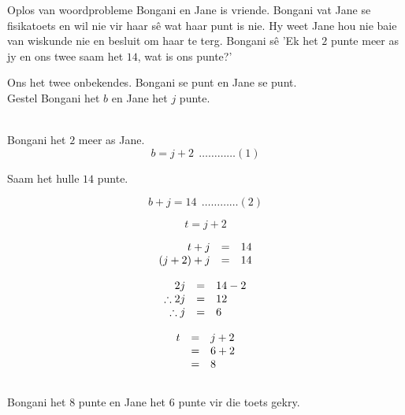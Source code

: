 \begin{wex}{Oplos van woordprobleme}{
Bongani en Jane is vriende. Bongani vat Jane se fisikatoets en wil nie vir haar s\^e wat haar punt is nie. Hy weet Jane hou nie baie van wiskunde nie en besluit om haar te terg. Bongani s\^e 
'Ek het $2$ punte meer as jy en ons twee saam het $14$, wat is ons punte?'}
{
Ons het twee onbekendes. Bongani se punt en Jane se punt.
\\Gestel Bongani het $b$ en Jane het $j$ punte. 

\\Bongani het $2$ meer as Jane.
\begin{equation*}
  b=j+2 ~~\ldots \ldots \ldots \ldots (1)
\end{equation*}

Saam het hulle $14$ punte.

\begin{equation*}
  b+j=14 ~~\ldots \ldots \ldots \ldots (2)
\end{equation*}

\begin{equation*}
t=j+2
\end{equation*}

\begin{equation*}
    \begin{array}{ccc}\hfill t+j& =& 14\hfill \\
	\hfill (j+2)+j& =& 14\hfill \\

    \end{array}
\end{equation*}

\begin{equation*}
    \begin{array}{ccl}\hfill 2j& =& 14 - 2\hfill \\
	\hfill \therefore 2j& =& 12\hfill \\
\hfill \therefore j &=& 6 \hfill

    \end{array}
\end{equation*}

\begin{equation*}
\begin{array}{ccl}\hfill t& =& j+2\hfill \\ & =& 6+2\hfill \\ & =& 8\hfill \end{array}
\end{equation*}
\\
Bongani het $8$ punte en Jane het  $6$ punte vir die toets gekry.\\
}
\end{wex}

